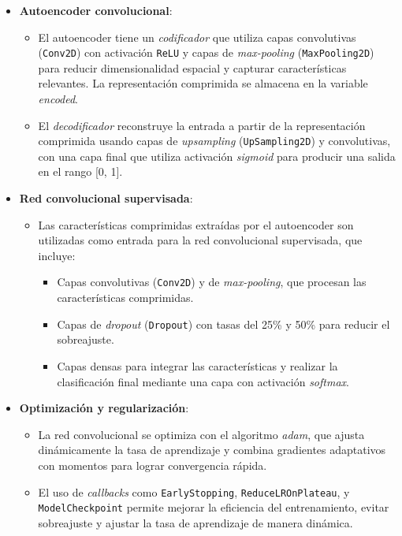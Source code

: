 \begin{itemize}
	\item \textbf{Autoencoder convolucional}:
	\begin{itemize}
		\item El autoencoder tiene un \textit{codificador} que utiliza capas convolutivas (\texttt{Conv2D}) con activación \texttt{ReLU} y capas de \textit{max-pooling} (\texttt{MaxPooling2D}) para reducir dimensionalidad espacial y capturar características relevantes. La representación comprimida se almacena en la variable \textit{encoded}.
		\item El \textit{decodificador} reconstruye la entrada a partir de la representación comprimida usando capas de \textit{upsampling} (\texttt{UpSampling2D}) y convolutivas, con una capa final que utiliza activación \textit{sigmoid} para producir una salida en el rango [0, 1].
	\end{itemize}
	
	\item \textbf{Red convolucional supervisada}:
	\begin{itemize}
		\item Las características comprimidas extraídas por el autoencoder son utilizadas como entrada para la red convolucional supervisada, que incluye:
		\begin{itemize}
			\item Capas convolutivas (\texttt{Conv2D}) y de \textit{max-pooling}, que procesan las características comprimidas.
			\item Capas de \textit{dropout} (\texttt{Dropout}) con tasas del 25\% y 50\% para reducir el sobreajuste.
			\item Capas densas para integrar las características y realizar la clasificación final mediante una capa con activación \textit{softmax}.
		\end{itemize}
	\end{itemize}
	
	\item \textbf{Optimización y regularización}:
	\begin{itemize}
		\item La red convolucional se optimiza con el algoritmo \textit{adam}, que ajusta dinámicamente la tasa de aprendizaje y combina gradientes adaptativos con momentos para lograr convergencia rápida.
		\item El uso de \textit{callbacks} como \texttt{EarlyStopping}, \texttt{ReduceLROnPlateau}, y \texttt{ModelCheckpoint} permite mejorar la eficiencia del entrenamiento, evitar sobreajuste y ajustar la tasa de aprendizaje de manera dinámica.
	\end{itemize}
\end{itemize}

